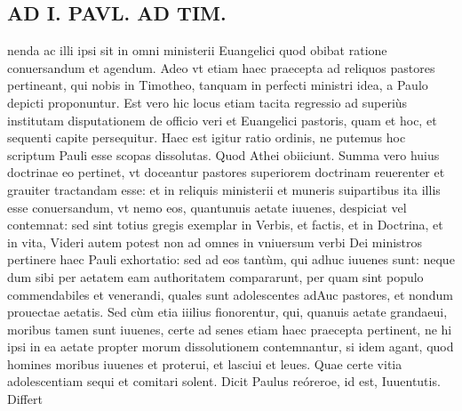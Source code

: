 \documentclass{article}
\begin{document}
\begin{pages}
\section*{AD I. PAVL. AD TIM. }
\marginpar{[ p.228 ]}\pstart nenda ac illi ipsi sit in omni ministerii Euangelici quod obibat ratione conuersandum et agendum. Adeo vt etiam haec praecepta ad reliquos pastores pertineant, qui nobis in Timotheo, tanquam in perfecti ministri idea, a Paulo depicti proponuntur. Est vero hic locus etiam tacita regressio ad superiùs institutam disputationem de officio veri et Euangelici pastoris, quam et hoc, et sequenti capite persequitur. Haec est igitur ratio ordinis, ne putemus hoc scriptum Pauli esse scopas dissolutas. Quod Athei obiiciunt. Summa vero huius doctrinae eo pertinet, vt doceantur pastores superiorem doctrinam reuerenter et grauiter tractandam esse: et in reliquis ministerii et muneris suipartibus ita illis esse conuersandum, vt nemo eos, quantunuis aetate iuuenes, despiciat vel contemnat: sed sint totius gregis exemplar in Verbis, et factis, et in Doctrina, et in vita, Videri autem potest non ad omnes in vniuersum verbi Dei ministros pertinere haec Pauli exhortatio: sed ad eos tantùm, qui adhuc iuuenes sunt: neque dum sibi per aetatem eam authoritatem compararunt, per quam sint populo commendabiles et venerandi, quales sunt adolescentes adAuc pastores, et nondum prouectae aetatis. Sed cùm etia iiilius fionorentur, qui, quanuis aetate grandaeui, moribus tamen sunt iuuenes, certe ad senes etiam haec praecepta pertinent, ne hi ipsi in ea aetate propter morum dissolutionem contemnantur, si idem agant, quod homines moribus iuuenes et proterui, et lasciui et leues. Quae certe vitia adolescentiam sequi et comitari solent.  \pend\pstart Dicit Paulus reóreroe, id est, Iuuentutis. Differt  \pend

\end{pages}
\end{document}
